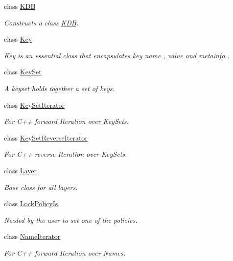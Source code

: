 \begin{DoxyCompactItemize}
class \hyperlink{classkdb_1_1KDB}{K\+DB}
\begin{DoxyCompactList}\small\item\em Constructs a class \hyperlink{classkdb_1_1KDB}{K\+DB}. \end{DoxyCompactList}\item 
class \hyperlink{classkdb_1_1Key}{Key}
\begin{DoxyCompactList}\small\item\em \hyperlink{classkdb_1_1Key}{Key} is an essential class that encapsulates key \hyperlink{group__keyname}{name }, \hyperlink{group__keyvalue}{value } and \hyperlink{group__keymeta}{metainfo }. \end{DoxyCompactList}\item 
class \hyperlink{classkdb_1_1KeySet}{Key\+Set}
\begin{DoxyCompactList}\small\item\em A keyset holds together a set of keys. \end{DoxyCompactList}\item 
class \hyperlink{classkdb_1_1KeySetIterator}{Key\+Set\+Iterator}
\begin{DoxyCompactList}\small\item\em For C++ forward Iteration over Key\+Sets. \end{DoxyCompactList}\item 
class \hyperlink{classkdb_1_1KeySetReverseIterator}{Key\+Set\+Reverse\+Iterator}
\begin{DoxyCompactList}\small\item\em For C++ reverse Iteration over Key\+Sets. \end{DoxyCompactList}\item 
class \hyperlink{classkdb_1_1Layer}{Layer}
\begin{DoxyCompactList}\small\item\em Base class for all layers. \end{DoxyCompactList}\item 
class \hyperlink{classkdb_1_1LockPolicyIs}{Lock\+Policy\+Is}
\begin{DoxyCompactList}\small\item\em Needed by the user to set one of the policies. \end{DoxyCompactList}\item 
class \hyperlink{classkdb_1_1NameIterator}{Name\+Iterator}
\begin{DoxyCompactList}\small\item\em For C++ forward Iteration over Names. \end{DoxyCompactList}\item 

\end{DoxyCompactItemize}
